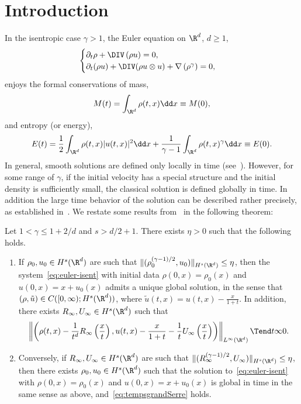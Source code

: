 \section{Introduction}\label{sec:intro}

In the isentropic case $\gamma>1$, the Euler equation on $\R^d$, $d\ge 1$,
\begin{equation}\label{eq:euler-isent}
\begin{cases}
\partial_t \rho+\DIV\left(\rho u\right)=0,\\
\partial_t (\rho u) +\DIV(\rho u\otimes u)+\nabla
\left(\rho^\gamma\right)= 0,
\end{cases}
\end{equation}
enjoys the formal conservations of mass,
\begin{equation*}
M(t) =\int_{\R^d}\rho(t,x)\dd x\equiv M(0),
\end{equation*}
and entropy (or energy),
\begin{equation*}
E(t) = \frac{1}{2}\int_{\R^d} \rho (t,x) |u(t,x)|^2 \dd x+\frac{1}{\gamma-1}\int_{\R^d}\rho(t,x)^\gamma
\dd x \equiv E(0).
\end{equation*}
In general, smooth solutions are defined only locally in time (see~\cite{MUK86,JYC90,Xin98}). However, for some range of $\gamma$, if the initial velocity has a special structure and the initial density is sufficiently small, the classical solution is defined globally in time. In addition the large time behavior of the solution can be described rather precisely, as established in~\cite{Serre97}. We restate some results from~\cite{Serre97} in the following theorem:
\begin{theo}\label{theo:serre}
Let $1<\gamma\le 1+2/d$ and $s>d/2+1$. There exists $\eta>0$ such that the following holds.
\begin{enumerate}
\item \label{1.1.1} If $\rho_0,u_0\in H^s(\R^d)$ are such that $\|(\rho_0^{(\gamma-1)/2},u_0)\|_{H^s(\R^d)}\le \eta $, then the system~\eqref{eq:euler-isent} with initial data $\rho(0,x) = \rho_0(x)$ and $u(0,x) = x + u_0(x)$ admits a unique global solution, in the sense that $(\rho,\tilde u)\in C([0,\infty);H^s(\R^d))$, where $\tilde u(t,x)=u(t,x)-\frac{x}{1+t}$. In addition, there exists $R_\infty,U_\infty\in H^s(\R^d)$ such that
\begin{equation}\label{eq:tempsgrandSerre}
\left\| \left(\rho (t,x)-\frac{1}{t^d}R_\infty\left(\frac{x}{t}\right),u(t,x) -\frac{x}{1+t}-\frac{1}{t}U_\infty
\left(\frac{x}{t}\right)\right)\right\|_{L^\infty(\R^d)}\Tend t \infty 0.
\end{equation}
\item \label{1.1.2} Conversely, if $R_\infty,U_\infty\in H^s(\R^d)$ are such that $\|(R_\infty^{(\gamma-1)/2},U_\infty)\|_{H^s(\R^d)}\le \eta$, then there exists $\rho_0,u_0\in H^s(\R^d)$ such that the solution to~\eqref{eq:euler-isent} with $ \rho(0,x)=\rho_0(x)$ and $ u(0,x) = x+u_0(x)$ is global in time in the same sense as above, and~\eqref{eq:tempsgrandSerre} holds.
\end{enumerate}
\end{theo}

